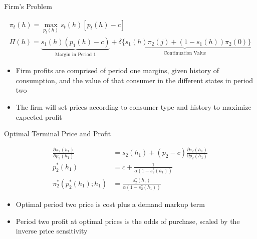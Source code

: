 \documentclass[aspectratio=169,professionalfonts]{beamer}
\begin{document}
\begin{frame}{Firm's Problem}
  \begin{tcolorbox}
    [
    boxsep=0pt,
    left=2pt, right=2pt,
    top=1pt, bottom=1pt,
    before skip=2pt, after skip=2pt
    ]
    \setlength{\abovedisplayskip}{2pt}
    \setlength{\belowdisplayskip}{2pt}
    \begin{gather*}
      \pi_t(h) = \max_{p_t(h)} s_t(h)[p_t(h) - c] \\ 
      \Pi(h) = \underbrace{s_1(h)(p_1(h) - c)}_{\text{Margin in Period 1}} + \underbrace{\delta\{s_1(h)\pi_2(j) + (1-s_1(h))\pi_2(0)\}}_\text{{Continuation Value}} 
    \end{gather*}
  \end{tcolorbox}
  \begin{itemize}
    \item Firm profits are comprised of period one margins, given history of consumption, and the value of that consumer in the different states in period two
    \item The firm will set prices according to consumer type and history to maximize expected profit
  \end{itemize}
\end{frame}

\begin{frame}{Optimal Terminal Price and Profit}
  \begin{tcolorbox}
    [
    boxsep=0pt,
    left=2pt, right=2pt,
    top=1pt, bottom=1pt,
    before skip=2pt, after skip=2pt
    ]
    \setlength{\abovedisplayskip}{2pt}
    \setlength{\belowdisplayskip}{2pt}
    \begin{align*}
      \frac{\partial\pi_2(h_1)}{\partial p_2(h_1)} &= s_2(h_1) + (p_2 - c)\frac{\partial s_2(h_1)}{\partial p_2(h_1)} \\
      p_2^*(h_1)&= c + \frac{1}{\alpha(1-s_2^*(h_1))} \\
      \pi^*_2(p_2^*(h_1); h_1) &= \frac{s_2^*(h_1)}{\alpha(1-s_2^*(h_1))}
    \end{align*}
  \end{tcolorbox}
  \begin{itemize}
    \item Optimal period two price is cost plus a demand markup term
    \item Period two profit at optimal prices is the odds of purchase, scaled by the inverse price sensitivity
  \end{itemize}
\end{frame}
\end{document}
